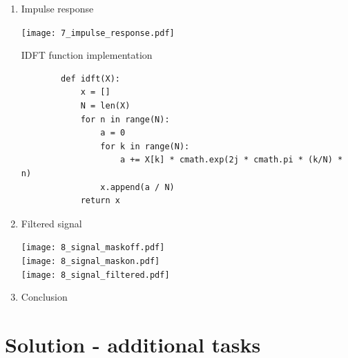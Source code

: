 \documentclass[a4paper, 11pt]{article}
\begin{document}
\begin{enumerate}
        \item
        Impulse response

        \texttt{[image: 7\_impulse\_response.pdf]}

        IDFT function implementation

        \begin{verbatim}
        def idft(X):
            x = []
            N = len(X)
            for n in range(N):
                a = 0
                for k in range(N):
                    a += X[k] * cmath.exp(2j * cmath.pi * (k/N) * n)
                x.append(a / N)
            return x
        \end{verbatim}

        \newpage

        \item
        Filtered signal

        \texttt{[image: 8\_signal\_maskoff.pdf]} \\
        \texttt{[image: 8\_signal\_maskon.pdf]} \\
        \texttt{[image: 8\_signal\_filtered.pdf]}

        \item
        Conclusion

    \end{enumerate}

    \newpage
    \section*{Solution - additional tasks}
\end{document}
